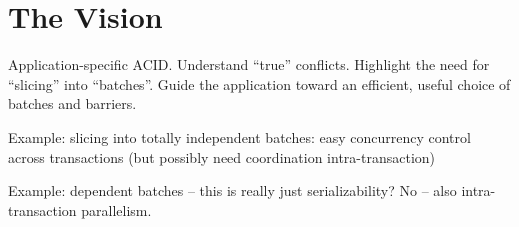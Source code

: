 \documentclass{sig-alternate}
\begin{document}
\section{The Vision}
Application-specific ACID.  Understand ``true'' conflicts.  Highlight the need for ``slicing'' into ``batches''.  Guide the application toward an efficient, useful choice of batches and barriers.

Example: slicing into totally independent batches: easy concurrency control across transactions (but possibly need coordination intra-transaction)

Example: dependent batches -- this is really just serializability?  No -- also intra-transaction parallelism.


\end{document}
